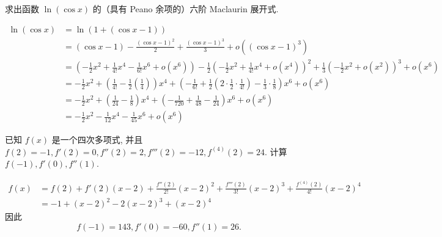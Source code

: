 \begin{exercise}[3.6.3]
    求出函数 $\ln(\cos x)$ 的（具有 Peano 余项的）六阶 Maclaurin 展开式.
\end{exercise}

\begin{solution}
    \begin{align*}
        \ln(\cos x) & = \ln(1 + (\cos x - 1))                                                                                                                                                                                                          \\
                    & = (\cos x - 1) - \frac{(\cos x - 1)^2}{2} + \frac{(\cos x - 1)^3}{3} + o((\cos x - 1)^3)                                                                                                                                         \\
                    & = \left(-\frac{1}{2}x^2 + \frac{1}{4!}x^4 - \frac{1}{6!}x^6 + o(x^6)\right) - \frac{1}{2}\left(-\frac{1}{2}x^2 + \frac{1}{4!}x^4 + o(x^4)\right)^2 + \frac{1}{3}\left(-\frac{1}{2}x^2 + o(x^2)\right)^3 + o(x^6)                 \\
                    & = -\frac{1}{2}x^2 + \left(\frac{1}{4!} - \frac{1}{2}\left(\frac{1}{4}\right)\right)x^4 + \left(-\frac{1}{6!} + \frac{1}{2}\left(2 \cdot \frac{1}{2} \cdot \frac{1}{4!}\right) - \frac{1}{3} \cdot \frac{1}{8}\right)x^6 + o(x^6) \\
                    & = -\frac{1}{2}x^2 + \left(\frac{1}{24} - \frac{1}{8}\right)x^4 + \left(-\frac{1}{720} + \frac{1}{48} - \frac{1}{24}\right)x^6 + o(x^6)                                                                                           \\
                    & = -\frac{1}{2}x^2 - \frac{1}{12}x^4 - \frac{1}{45}x^6 + o(x^6)
    \end{align*}
\end{solution}

\begin{exercise}[3.6.4]
    已知 $f(x)$ 是一个四次多项式, 并且 $f(2) = -1, f'(2) = 0, f''(2) = 2, f'''(2) = -12, f^{(4)}(2) = 24$. 计算 $f(-1), f'(0), f''(1)$.
\end{exercise}

\begin{solution}
    \begin{align*}
        f(x) & = f(2) + f'(2)(x - 2) + \frac{f''(2)}{2!}(x - 2)^2 + \frac{f'''(2)}{3!}(x - 2)^3 + \frac{f^{(4)}(2)}{4!}(x - 2)^4 \\
             & = -1 + (x - 2)^2 - 2(x - 2)^3 + (x - 2)^4
    \end{align*}
    因此$$f(-1) = 143, f'(0) = -60, f''(1) = 26.$$
\end{solution}

